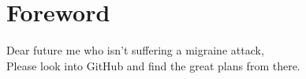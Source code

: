 \documentclass[../wifi-security.tex]{subfiles}
\begin{document}
\chapter{Foreword}

Dear future me who isn't suffering a migraine attack,\\
Please look into GitHub and find the great plans from there.
\end{document}
